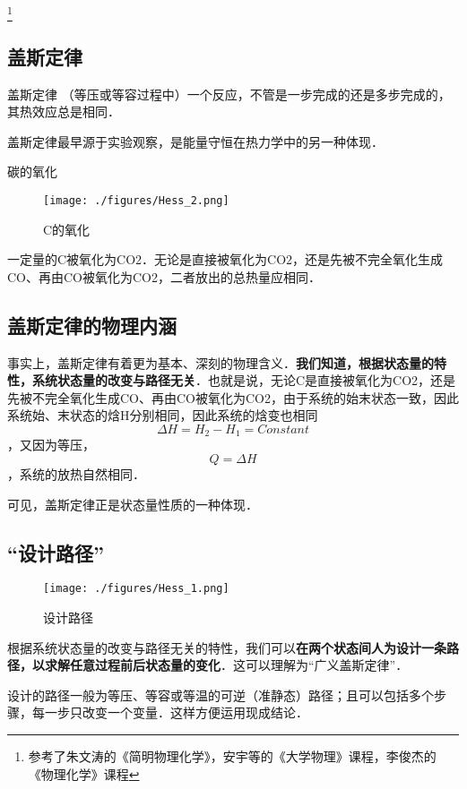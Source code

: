 

\footnote{参考了朱文涛的《简明物理化学》，安宇等的《大学物理》课程，李俊杰的《物理化学》课程}

\subsection{盖斯定律}
\begin{theorem}{盖斯定律}
（等压或等容过程中）一个反应，不管是一步完成的还是多步完成的，其热效应总是相同．
\end{theorem}
盖斯定律最早源于实验观察，是能量守恒在热力学中的另一种体现．

\begin{example}{碳的氧化}
\begin{figure}[ht]
\centering
\texttt{[image: ./figures/Hess\_2.png]}
\caption{C的氧化} \label{Hess_fig2}
\end{figure}
一定量的C被氧化为CO2．无论是直接被氧化为CO2，还是先被不完全氧化生成CO、再由CO被氧化为CO2，二者放出的总热量应相同．
\end{example}

\subsection{盖斯定律的物理内涵}
事实上，盖斯定律有着更为基本、深刻的物理含义．\textbf{我们知道，根据状态量的特性，系统状态量的改变与路径无关}．也就是说，无论C是直接被氧化为CO2，还是先被不完全氧化生成CO、再由CO被氧化为CO2，由于系统的始末状态一致，因此系统始、末状态的焓H分别相同，因此系统的焓变也相同$$\Delta H=H_2-H_1=Constant$$，又因为等压，$$Q=\Delta H$$，系统的放热自然相同．

可见，盖斯定律正是状态量性质的一种体现．

\subsection{“设计路径”}
\begin{figure}[ht]
\centering
\texttt{[image: ./figures/Hess\_1.png]}
\caption{设计路径} \label{Hess_fig1}
\end{figure}

根据系统状态量的改变与路径无关的特性，我们可以\textbf{在两个状态间人为设计一条路径，以求解任意过程前后状态量的变化}．这可以理解为“广义盖斯定律”．

设计的路径一般为等压、等容或等温的可逆（准静态）路径；且可以包括多个步骤，每一步只改变一个变量．这样方便运用现成结论．

